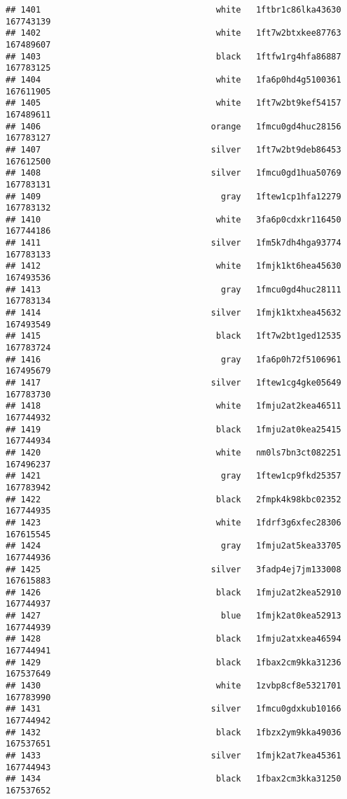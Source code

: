 \documentclass[
]{article}
\begin{document}
\begin{verbatim}
## 1401                                   white   1ftbr1c86lka43630 167743139
## 1402                                   white   1ft7w2btxkee87763 167489607
## 1403                                   black   1ftfw1rg4hfa86887 167783125
## 1404                                   white   1fa6p0hd4g5100361 167611905
## 1405                                   white   1ft7w2bt9kef54157 167489611
## 1406                                  orange   1fmcu0gd4huc28156 167783127
## 1407                                  silver   1ft7w2bt9deb86453 167612500
## 1408                                  silver   1fmcu0gd1hua50769 167783131
## 1409                                    gray   1ftew1cp1hfa12279 167783132
## 1410                                   white   3fa6p0cdxkr116450 167744186
## 1411                                  silver   1fm5k7dh4hga93774 167783133
## 1412                                   white   1fmjk1kt6hea45630 167493536
## 1413                                    gray   1fmcu0gd4huc28111 167783134
## 1414                                  silver   1fmjk1ktxhea45632 167493549
## 1415                                   black   1ft7w2bt1ged12535 167783724
## 1416                                    gray   1fa6p0h72f5106961 167495679
## 1417                                  silver   1ftew1cg4gke05649 167783730
## 1418                                   white   1fmju2at2kea46511 167744932
## 1419                                   black   1fmju2at0kea25415 167744934
## 1420                                   white   nm0ls7bn3ct082251 167496237
## 1421                                    gray   1ftew1cp9fkd25357 167783942
## 1422                                   black   2fmpk4k98kbc02352 167744935
## 1423                                   white   1fdrf3g6xfec28306 167615545
## 1424                                    gray   1fmju2at5kea33705 167744936
## 1425                                  silver   3fadp4ej7jm133008 167615883
## 1426                                   black   1fmju2at2kea52910 167744937
## 1427                                    blue   1fmjk2at0kea52913 167744939
## 1428                                   black   1fmju2atxkea46594 167744941
## 1429                                   black   1fbax2cm9kka31236 167537649
## 1430                                   white   1zvbp8cf8e5321701 167783990
## 1431                                  silver   1fmcu0gdxkub10166 167744942
## 1432                                   black   1fbzx2ym9kka49036 167537651
## 1433                                  silver   1fmjk2at7kea45361 167744943
## 1434                                   black   1fbax2cm3kka31250 167537652

\end{verbatim}
\end{document}
